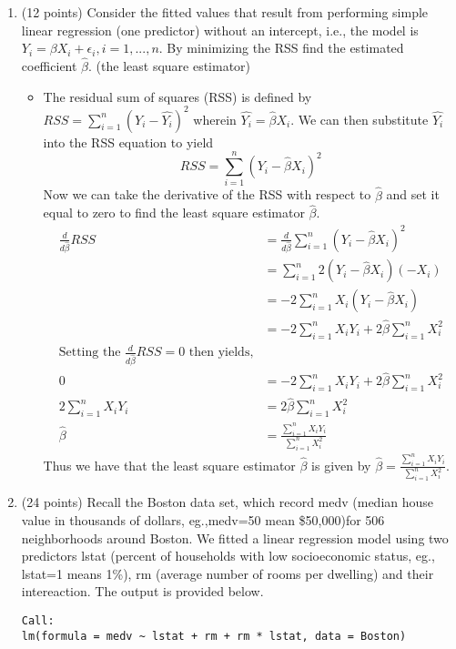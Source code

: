 \documentclass[
]{article}
\begin{document}
\begin{enumerate}
\newpage
\item (12 points) Consider the fitted values that result from performing simple linear regression (one predictor) without an intercept, i.e., the model is $Y_i = \beta X_i + \epsilon_i, i = 1,...,n$. By minimizing the RSS find the estimated coefficient $\hat{\beta}$. (the least square estimator) 

\begin{itemize}
\item The residual sum of squares (RSS) is defined by $ RSS = \sum_{i=1}^{n} (Y_i - \hat{Y_i})^2 $ wherein $\hat{Y_i} = \hat{\beta}X_i$. We can then substitute $\hat{Y_i}$ into the RSS equation to yield 
$$
RSS = \sum_{i=1}^{n} (Y_i - \hat{\beta}X_i)^2
$$
Now we can take the derivative of the RSS with respect to $\hat{\beta}$ and set it equal to zero to find the least square estimator $\hat{\beta}$.
\begin{align*}
\frac{d}{d\hat{\beta}}RSS &= \frac{d}{d\hat{\beta}}\sum_{i=1}^{n} (Y_i - \hat{\beta}X_i)^2 \\
&= \sum_{i=1}^{n} 2(Y_i - \hat{\beta}X_i)(-X_i)\\
&= -2\sum_{i=1}^{n} X_i(Y_i - \hat{\beta}X_i) \\
&= -2\sum_{i=1}^{n} X_iY_i + 2\hat{\beta}\sum_{i=1}^{n} X_i^2 \\
\text{Setting the $\frac{d}{d\hat{\beta}}RSS= 0$ then yields,} \\
0 &= -2\sum_{i=1}^{n} X_iY_i + 2\hat{\beta}\sum_{i=1}^{n} X_i^2 \\
2\sum_{i=1}^{n} X_iY_i &= 2\hat{\beta}\sum_{i=1}^{n} X_i^2 \\
\hat{\beta} &= \frac{\sum_{i=1}^{n} X_iY_i}{\sum_{i=1}^{n} X_i^2}
\end{align*}
Thus we have that the least square estimator $\hat{\beta}$ is given by $\hat{\beta} = \frac{\sum_{i=1}^{n} X_iY_i}{\sum_{i=1}^{n} X_i^2}$.
\end{itemize}

\newpage
\item (24 points) Recall the Boston data set, which record medv (median house value in thousands of dollars, eg.,medv=50 mean \$50,000)for 506 neighborhoods around Boston. We fitted a linear regression model using two predictors lstat (percent of households with low socioeconomic status, eg., lstat=1 means 1\%), rm (average number of rooms per dwelling) and their intereaction. The output is provided below.
\begin{verbatim}
Call:
lm(formula = medv ~ lstat + rm + rm * lstat, data = Boston)


\end{verbatim}
\end{enumerate}
\end{document}
